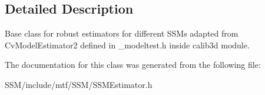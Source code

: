 \subsection{Detailed Description}
Base class for robust estimators for different S\-S\-Ms adapted from Cv\-Model\-Estimator2 defined in \-\_\-modeltest.\-h inside calib3d module. 

The documentation for this class was generated from the following file\-:\begin{DoxyCompactItemize}
\item 
S\-S\-M/include/mtf/\-S\-S\-M/S\-S\-M\-Estimator.\-h\end{DoxyCompactItemize}
